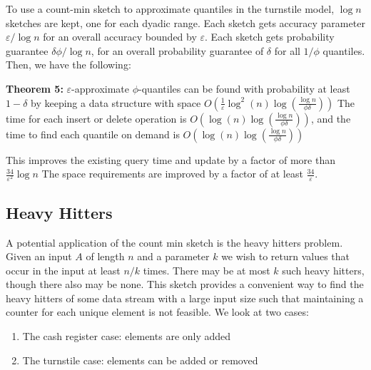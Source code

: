 \documentclass[11pt]{article}
\begin{document}
To use a count-min sketch to approximate quantiles in the turnstile model, $\log n$ sketches are kept,
one for each dyadic range. Each sketch gets accuracy parameter $\varepsilon/\log n$ for an overall accuracy
bounded by $\varepsilon$. Each sketch gets probability guarantee $\delta\phi/\log n$, for
an overall probability guarantee of $\delta$ for all $1/\phi$ quantiles. Then, we have the following:

\textbf{Theorem 5:} $\varepsilon$-approximate $\phi$-quantiles can be found with probability at least
$1 - \delta$ by keeping a data structure with space $O\left(\frac{1}{\varepsilon}
\log^2(n) \log \left(\frac{\log n}{\phi \delta}\right)\right)$ The time for each insert or delete operation is
$O\left(\log(n) \log \left(\frac{\log n}{\phi \delta}\right)\right)$, and the time to find each quantile on demand 
is $O\left(\log(n)\log\left(\frac{\log n}{\phi \delta}\right)\right)$

This improves the existing query time and update by a factor of more than $\frac{34}{\varepsilon^2} \log n$
The space requirements are improved by a factor of at least $\frac{34}{\varepsilon}$. 

\subsection{Heavy Hitters}
A potential application of the count min sketch is the heavy hitters problem. Given an input $A$ of length $n$ and a parameter $k$ we wish to return values that occur in the input at least $n/k$ times. There may be at most $k$ such heavy hitters, though there also may be none. This sketch provides a convenient way to find the heavy hitters of some data stream with a large input size such that maintaining a counter for each unique element is not feasible. We look at two cases:
\begin{enumerate}
\item The cash register case: elements are only added
\item The turnstile case: elements can be added or removed
\end{enumerate}
\end{document}
